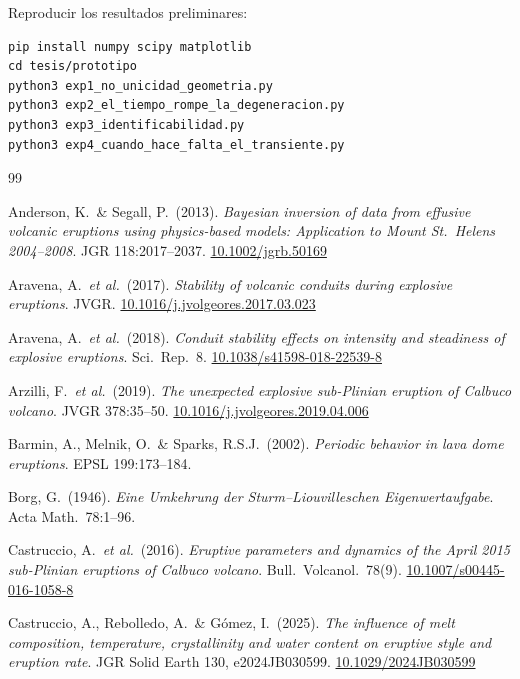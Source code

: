 \documentclass[11pt,a4paper]{article}
\theoremstyle{plain}
\theoremstyle{definition}
\theoremstyle{remark}
\begin{document}
\vspace{0.6em}
Reproducir los resultados preliminares:
\begin{verbatim}
pip install numpy scipy matplotlib
cd tesis/prototipo
python3 exp1_no_unicidad_geometria.py
python3 exp2_el_tiempo_rompe_la_degeneracion.py
python3 exp3_identificabilidad.py
python3 exp4_cuando_hace_falta_el_transiente.py
\end{verbatim}

\begin{thebibliography}{99}\small

 Anderson, K.\ \& Segall, P.\ (2013).
  \emph{Bayesian inversion of data from effusive volcanic eruptions
  using physics-based models: Application to Mount St.\ Helens
  2004--2008}. JGR 118:2017--2037.
  \href{https://doi.org/10.1002/jgrb.50169}{10.1002/jgrb.50169}

 Aravena, A.\ \emph{et al.}\ (2017).
  \emph{Stability of volcanic conduits during explosive eruptions}.
  JVGR.
  \href{https://doi.org/10.1016/j.jvolgeores.2017.03.023}{10.1016/j.jvolgeores.2017.03.023}

 Aravena, A.\ \emph{et al.}\ (2018).
  \emph{Conduit stability effects on intensity and steadiness of
  explosive eruptions}. Sci.\ Rep.\ 8.
  \href{https://doi.org/10.1038/s41598-018-22539-8}{10.1038/s41598-018-22539-8}

 Arzilli, F.\ \emph{et al.}\ (2019).
  \emph{The unexpected explosive sub-Plinian eruption of Calbuco
  volcano}. JVGR 378:35--50.
  \href{https://doi.org/10.1016/j.jvolgeores.2019.04.006}{10.1016/j.jvolgeores.2019.04.006}

 Barmin, A., Melnik, O.\ \& Sparks, R.S.J.\ (2002).
  \emph{Periodic behavior in lava dome eruptions}. EPSL 199:173--184.

 Borg, G.\ (1946).
  \emph{Eine Umkehrung der Sturm--Liouvilleschen Eigenwertaufgabe}.
  Acta Math.\ 78:1--96.

 Castruccio, A.\ \emph{et al.}\ (2016).
  \emph{Eruptive parameters and dynamics of the April 2015
  sub-Plinian eruptions of Calbuco volcano}. Bull.\ Volcanol.\ 78(9).
  \href{https://doi.org/10.1007/s00445-016-1058-8}{10.1007/s00445-016-1058-8}

 Castruccio, A., Rebolledo, A.\ \& Gómez, I.\ (2025).
  \emph{The influence of melt composition, temperature, crystallinity
  and water content on eruptive style and eruption rate}.
  JGR Solid Earth 130, e2024JB030599.
  \href{https://doi.org/10.1029/2024JB030599}{10.1029/2024JB030599}


\end{thebibliography}
\end{document}
